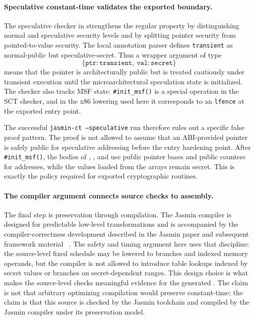 \documentclass[10pt,twocolumn]{article}
\newcommand{\jasmin}{Jasmin}
\newcommand{\ct}{constant-time}
\begin{document}
\paragraph{Speculative \ct{} validates the exported boundary.}
The speculative checker in  strengthens the
regular property by distinguishing normal and speculative security levels and
by splitting pointer security from pointed-to-value security.  The local
annotation parser defines \texttt{transient} as normal-public but
speculative-secret.  Thus a wrapper argument of type
\[
  \{\texttt{ptr}:\texttt{transient},\ \texttt{val}:\texttt{secret}\}
\]
means that the pointer is architecturally public but is treated cautiously under
transient execution until the microarchitectural speculation state is
initialized.  The checker also tracks MSF state: \texttt{\#init\_msf()} is a
special operation in the SCT checker, and in the x86 lowering used here it
corresponds to an \texttt{lfence} at the exported entry point.

The successful \texttt{jasmin-ct --speculative} run therefore rules out a
specific false proof pattern.  The proof is not allowed to assume that an
ABI-provided pointer is safely public for speculative addressing before the
entry hardening point.  After \texttt{\#init\_msf()}, the bodies of
, , and  use public
pointer bases and public counters for addresses, while the values loaded from
the arrays remain secret.  This is exactly the policy required for exported
cryptographic routines.

\paragraph{The compiler argument connects source checks to assembly.}
The final step is preservation through compilation.  The \jasmin{} compiler is
designed for predictable low-level transformations and is accompanied by the
compiler-correctness development described in the \jasmin{} paper
and subsequent framework material
~\cite{Jasmin2017,LastMile2020,JasminFramework2026}.  The safety and timing
argument here uses that discipline:
the source-level fixed schedule may be lowered to branches and indexed memory
operands, but the compiler is not allowed to introduce table lookups indexed by
secret values or branches on secret-dependent ranges.  This design choice is
what makes the source-level checks meaningful evidence for the generated
.  The claim is not that arbitrary optimizing compilation would
preserve \ct{}; the claim is that this source is checked by the \jasmin{}
toolchain and compiled by the \jasmin{} compiler under its preservation model.
\end{document}
